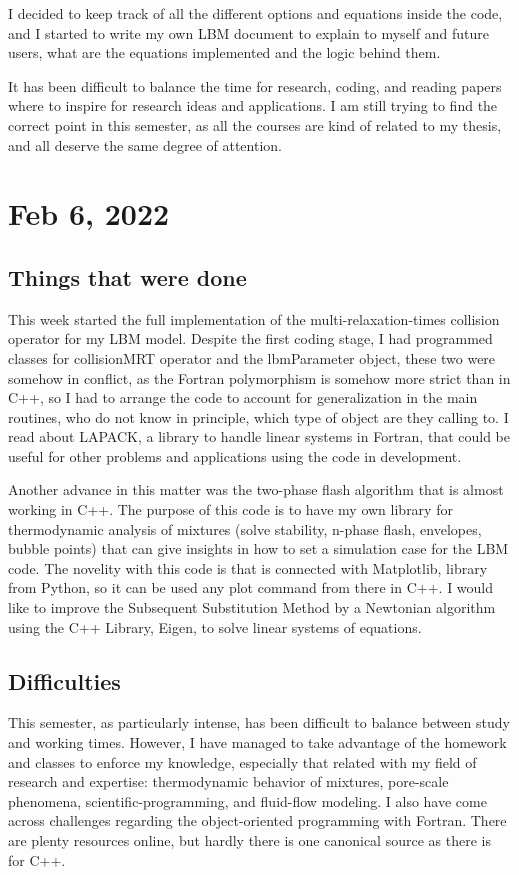 \documentclass[12pt]{article}
\begin{document}
	I decided to keep track of all the different options and equations inside the code, and I started to write my own LBM document to explain to myself and future users, what are the equations implemented and the logic behind them. 
	
	It has been difficult to balance the time for research, coding, and reading papers where to inspire for research ideas and applications. I am still trying to find the correct point in this semester, as all the courses are kind of related to my thesis, and all deserve the same degree of attention. 
	
	\pagebreak
	
	\section*{Feb 6, 2022}
	
	\subsection*{Things that were done}
	This week started the full implementation of the multi-relaxation-times collision operator for my LBM model. Despite the first coding stage, I had programmed classes for collisionMRT operator and the lbmParameter object, these two were somehow in conflict, as the Fortran polymorphism is somehow more strict than in C++, so I had to arrange the code to account for generalization in the main routines, who do not know in principle, which type of object are they calling to. I read about LAPACK, a library to handle linear systems in Fortran, that could be useful for other problems and applications using the code in development. 
	
	Another advance in this matter was the two-phase flash algorithm that is almost working in C++. The purpose of this code is to have my own library for thermodynamic analysis of mixtures (solve stability, n-phase flash, envelopes, bubble points) that can give insights in how to set a simulation case for the LBM code. The novelity with this code is that is connected with Matplotlib, library from Python, so it can be used any plot command from there in C++. I would like to improve the Subsequent Substitution Method by a Newtonian algorithm using the C++ Library, Eigen, to solve linear systems of equations. 
		
	\subsection*{Difficulties}
	This semester, as particularly intense, has been difficult to balance between study and working times. However, I have managed to take advantage of the homework and classes to enforce my knowledge, especially that related with my field of research and expertise: thermodynamic behavior of mixtures, pore-scale phenomena, scientific-programming, and fluid-flow modeling. I also have come across challenges regarding the object-oriented programming with Fortran. There are plenty resources online, but hardly there is one canonical source as there is for C++. 
	
\end{document}

